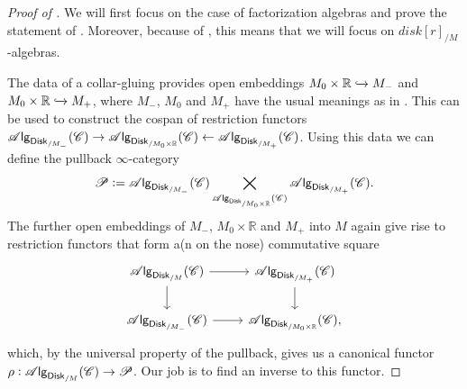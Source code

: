 \documentclass[../text]{subfiles}
\begin{document}
\begin{proof}[Proof of ]
    We will first focus on the case of factorization algebras and prove the statement of . Moreover, because of , this means that we will focus on $
    disk[r]_{/M}$-algebras.
    
    The data of a collar-gluing provides open embeddings $M_0 \times \mathbb{R} \xhookrightarrow{} M_-$ and $M_0 \times \mathbb{R} \xhookrightarrow{} M_+$, where $M_-$, $M_0$ and $M_+$ have the usual meanings as in . This can be used to construct the cospan of restriction functors $\alg{\disk[r]_{/M_-}} (\catC) \rightarrow \alg{\disk[r]_{/M_0 \times \mathbb{R}}} (\catC) \leftarrow \alg{\disk[r]_{/M_+}} (\catC)$. Using this data we can define the pullback $\infty$-category
    \begin{equation}
        \mathscr{P} := \alg{\disk[r]_{/M_-}} (\catC) \bigtimes_{\alg{\disk[r]_{/M_0 \times \mathbb{R}}} (\catC)} \alg{\disk[r]_{/M_+}} (\catC).
    \end{equation}
    The further open embeddings of $M_-$, $M_0 \times \mathbb{R}$ and $M_+$ into $M$ again give rise to restriction functors that form a(n on the nose) commutative square
    \begin{equation}
        \begin{tikzcd}
            \alg{\disk[r]_{/M}} (\catC) \arrow[r] \arrow[d] & \alg{\disk[r]_{/M_+}} (\catC) \arrow[d] \\
            \alg{\disk[r]_{/M_-}} (\catC) \arrow[r] & \alg{\disk[r]_{/M_0 \times \mathbb{R}}} (\catC),
        \end{tikzcd}
    \end{equation}
    which, by the universal property of the pullback, gives us a canonical functor $\rho: \alg{\disk[r]_{/M}} (\catC) \rightarrow \mathscr{P}$. Our job is to find an inverse to this functor.
    

\end{proof}
\end{document}
